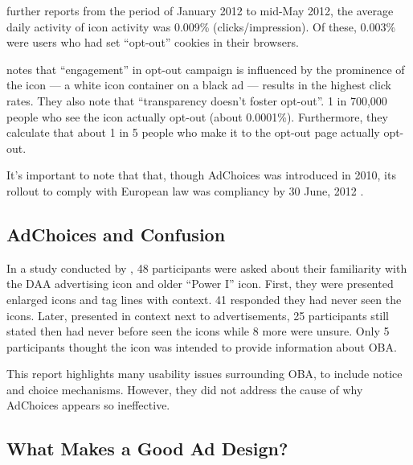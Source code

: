  \citet{AdChoicesOurExpe:2012ux}  further reports from the period of January 2012 to mid-May 2012, the average daily activity of icon activity was 0.009\% (clicks\slash impression). Of these, 0.003\% were users who had set ``opt-out'' cookies in their browsers.

 \citet{Logic:2011wn}  notes that ``engagement'' in opt-out campaign is influenced by the prominence of the icon --- a white icon container on a black ad --- results in the highest click rates. They also note that ``transparency doesn't foster opt-out''. 1 in 700,000 people who see the icon actually opt-out (about 0.0001\%). Furthermore, they calculate that about 1 in 5 people who make it to the opt-out page actually opt-out. 

It's important to note that that, though AdChoices was introduced in 2010, its rollout to comply with European law was compliancy by 30 June, 2012  \citep{Anonymous:iPLCQu77}. 

\subsection{AdChoices and Confusion}
\label{adchoicesandconfusion}

In a study conducted by  \citet{Ur:2012ws},  48 participants were asked about their familiarity with the DAA advertising icon and older ``Power I'' icon. First, they were presented enlarged icons and tag lines with context. 41 responded they had never seen the icons. Later, presented in context next to advertisements, 25 participants still stated then had never before seen the icons while 8 more were unsure. Only 5 participants thought the icon was intended to provide information about OBA.

This report highlights many usability issues surrounding OBA, to include notice and choice mechanisms. However, they did not address the cause of why AdChoices appears so ineffective.

\subsection{What Makes a Good Ad Design?}
\label{whatmakesagoodaddesign}


